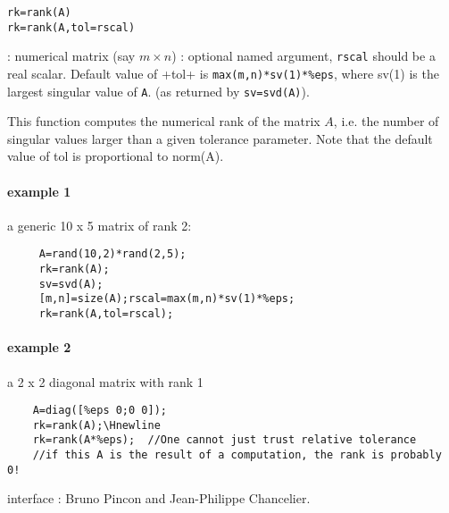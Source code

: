 
\begin{mandesc}
\end{mandesc}

\begin{calling_sequence}
\begin{verbatim}
rk=rank(A)
rk=rank(A,tol=rscal)
\end{verbatim}
\end{calling_sequence}
\begin{parameters}
  \begin{varlist}
    :  numerical matrix (say $m \times n$)
    : optional named argument, \verb+rscal+ should be a real scalar. Default value of \ver+tol+ is \verb+max(m,n)*sv(1)*%eps+, where sv(1) is the largest singular value of \verb+A+. (as returned by \verb+sv=svd(A)+).
  \end{varlist}
\end{parameters}

\begin{mandescription}
This function computes the numerical rank of the matrix $A$, i.e. the number
of singular values larger than a given tolerance parameter. Note that the 
default value of tol is proportional to norm(A).
\end{mandescription}

\begin{examples}
\paragraph{example 1} a generic 10 x 5 matrix of rank 2:
  \begin{Verbatim}
     A=rand(10,2)*rand(2,5);
     rk=rank(A);
     sv=svd(A);
     [m,n]=size(A);rscal=max(m,n)*sv(1)*%eps;
     rk=rank(A,tol=rscal);
  \end{Verbatim}
\paragraph{example 2} a 2 x 2 diagonal matrix with rank 1
  \begin{Verbatim}
    A=diag([%eps 0;0 0]);
    rk=rank(A);\Hnewline
    rk=rank(A*%eps);  //One cannot just trust relative tolerance
    //if this A is the result of a computation, the rank is probably 0! 
  \end{Verbatim}

\end{examples}

\begin{manseealso}
\end{manseealso}

\begin{authors}
   interface : Bruno Pincon and Jean-Philippe Chancelier. 
\end{authors}
